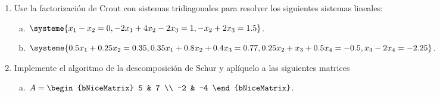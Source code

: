 \documentclass[
	spanish,
	8pt,
	utf8,
	xcolor=table,
	handout,
	aspectratio=169,
	professionalfonts,
	notheorems,
	mathserif,
]{beamer}
\newcounter{savedenum}
\newcommand*{\resume}{\setcounter{enumi}{\thesavedenum}}
\begin{document}
\begin{frame}
	\begin{enumerate}
		\resume

		\item
		      Use la factorización de Crout con sistemas tridiagonales
		      para resolver los siguientes sistemas lineales:

		      \begin{multicols}{2}
			      \begin{enumerate}[a)]
				      \item

				            \begin{math}
					            \systeme{
					            x_{1}-
					            x_{2}=
					            0,
					            -2x_{1}+
					            4x_{2}-
					            2x_{3}=
					            1,
					            -x_{2}+
					            2x_{3}=
					            1.5
					            }
				            \end{math}.

				      \item

				            \begin{math}
					            \systeme{
						            0.5x_{1}+
						            0.25x_{2}=
						            0.35,
						            0.35x_{1}+
						            0.8x_{2}+
						            0.4x_{3}=
						            0.77,
						            0.25x_{2}+
						            x_{3}+
						            0.5x_{4}=
						            -0.5,
						            x_{3}-
						            2x_{4}=
						            -2.25
					            }
				            \end{math}.
			      \end{enumerate}
		      \end{multicols}

		\item

		      Implemente el algoritmo de la descomposición de Schur y
		      aplíquelo a las siguientes matrices

		      \begin{multicols}{2}
			      \begin{enumerate}[a)]
				      \item

				            \begin{math}
					            A=
					            \begin{bNiceMatrix}
						            5  & 7  \\
						            -2 & -4
					            \end{bNiceMatrix}
				            \end{math}.


\end{enumerate}
\end{multicols}
\end{enumerate}
\end{frame}
\end{document}
